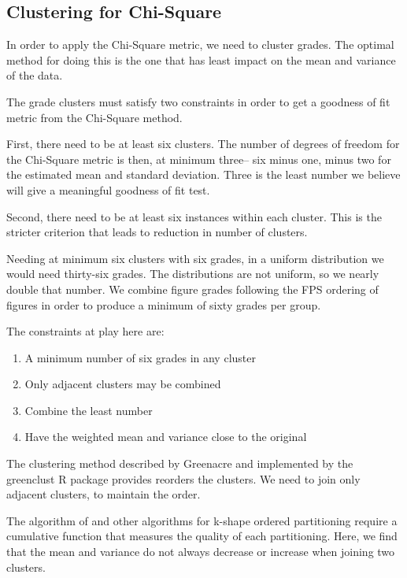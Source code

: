 \subsection{Clustering for Chi-Square}

In order to apply the Chi-Square metric, we need to cluster grades.
The optimal method for doing this is the one that has least impact on
the mean and variance of the data.

The grade clusters must satisfy two constraints in order to get a goodness
of fit metric from the Chi-Square method.

First, there need to be at least six clusters. The number of degrees of freedom
for the Chi-Square metric is then, at minimum three--
six minus one, minus two for the estimated mean and standard deviation.
Three is the least number we believe will give a meaningful goodness of fit
test.

Second, there need to be at least six instances within each cluster. This is
the stricter criterion that leads to reduction in number of clusters.

Needing at minimum six clusters with six grades, in a uniform distribution
we would need thirty-six grades. The distributions are not uniform, so we
nearly double that number. We combine figure grades following the FPS ordering
of figures in order to produce a minimum of sixty grades per group.

The constraints at play here are:

\begin{enumerate}
\item{A minimum number of six grades in any cluster}
\item{Only adjacent clusters may be combined}
\item{Combine the least number}
\item{Have the weighted mean and variance close to the original}
\end{enumerate}

The clustering  method described by
Greenacre \cite{Greenacre}
and implemented by the
greenclust \cite{greenclust}
R package provides reorders the clusters.
We need to join only adjacent clusters, to maintain the order.

The algorithm of \cite{partitioning} and other algorithms for k-shape
ordered partitioning require a cumulative
function that measures the quality of each partitioning.
Here, we find that the mean and variance do not always decrease or
increase when joining two clusters.

